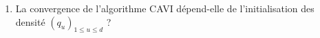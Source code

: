 \documentclass[a4paper,10pt,fleqn]{article}
\newcommand{\1}{\ensuremath{\mathbbm{1}}}
\begin{document}
\begin{enumerate}
%
\item La convergence de l'algorithme CAVI  d\'epend-elle de l'initialisation des densit\'e $(q_u)_{1\leqslant u\leqslant d}$ ?

%
\end{enumerate}
\end{document}

